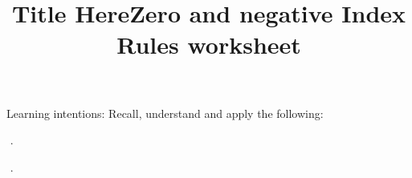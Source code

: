 \documentclass[12pt, a4paper, addpoints]{exam}
\title{Title Here}
\title{Zero and negative Index Rules worksheet}
\date{}
\newcommand{\ts}{\vspace{16mm}}
\begin{document}

\maketitle
\vspace{-28mm}

\large

\begin{questions}



\question Learning intentions: Recall, understand and apply the following:
\Large

\large





\question       $ $ .
\setlength{\columnsep}{20pt}
\begin{multicols}{6}
\begin{parts}
\part
\part
\end{parts}
\end{multicols}
\ts

\question       $ $ .
\setlength{\columnsep}{20pt}
\begin{multicols}{6}
\begin{parts}

\end{parts}
\end{multicols}
\end{questions}
\end{document}
